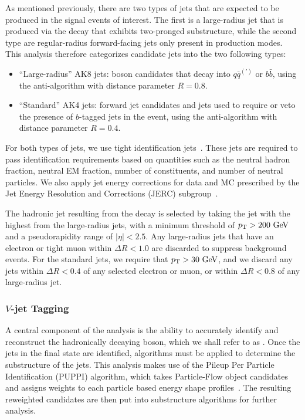 As mentioned previously, there are two types of jets that are expected to be produced in the signal events of interest.
The first is a large-radius jet that is produced via the \VorH decay that exhibits two-pronged substructure, while the second type are regular-radius forward-facing jets only present in \VBF production modes.
This analysis therefore categorizes candidate jets into the two following types:
\begin{itemize}
  \item ``Large-radius'' AK8 jets: \VorH boson candidates that decay into $q\bar{q}^{(\prime)}$ or $b\bar{b}$, using the anti-\kt algorithm with distance parameter $R=0.8$.
  \item ``Standard'' AK4 jets: \VBF forward jet candidates and jets used to require or veto the presence of $b$-tagged jets in the event, using the anti-\kt algorithm with distance parameter $R=0.4$.
\end{itemize}

For both types of jets, we use tight identification jets~\cite{jetID2016,jetID2017,jetID2018}.
These jets are required to pass identification requirements based on quantities such as the neutral hadron fraction, neutral EM fraction, number of constituents, and number of neutral particles.
We also apply jet energy corrections for data and MC prescribed by the Jet Energy Resolution and Corrections (JERC) subgroup~\cite{JetEnergyScale}.

The hadronic jet resulting from the \VorH decay is selected by taking the jet with the highest \pt from the large-radius jets, with a minimum threshold of $\pt>200\unit{GeV}$ and a pseudorapidity range of $|\eta|<2.5$.
Any large-radius jets that have an electron or tight muon within $\Delta R<1.0$ are discarded to suppress background events.
For the standard jets, we require that $\pt>30\unit{GeV}$, and we discard any jets within $\Delta R<0.4$ of any selected electron or muon, or within $\Delta R<0.8$ of any large-radius jet.

\subsubsection{$V$-jet Tagging}

A central component of the analysis is the ability to accurately identify and reconstruct the hadronically decaying \VorH boson, which we shall refer to as \Vhad.
Once the jets in the final state are identified, algorithms must be applied to determine the substructure of the jets.
This analysis makes use of the Pileup Per Particle Identification (PUPPI) algorithm, which takes Particle-Flow object candidates and assigns weights to each particle based energy shape profiles~\cite{Bertolini_2014}.
The resulting reweighted candidates are then put into substructure algorithms for further analysis.

